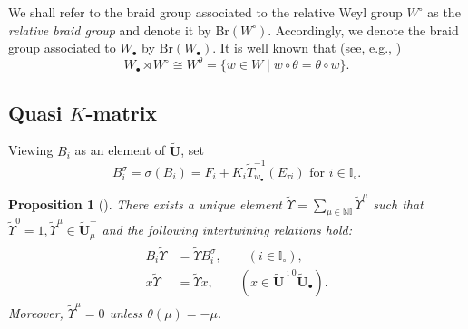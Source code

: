 \documentclass[a4paper,reqno,12pt]{amsart}
\numberwithin{equation}{section}
\newtheorem{proposition}{Proposition}[section]
\theoremstyle{definition}
\theoremstyle{plain}
\theoremstyle{definition}
\def\N{\mathbb N}
\def\I{\mathbb I}
\def\wI{\I_\circ}
\def\bw{w_\bullet}
\def\tU{\widetilde{\mathbf U}}
\def\tUi{\widetilde{\mathbf U}^{\imath}}
\def \tbU{\tU_{\bullet}}
\def\tTD{\widetilde T}
\def\tTT{\widetilde{\mathbf T}}
\def\tfX{\widetilde\Upsilon}
\begin{document}
We shall refer to the braid group associated to the relative Weyl group $W^\circ$ as the {\em relative braid group} and denote it by $\mathrm{Br}(W^\circ)$. Accordingly, we denote the braid group associated to $W_\bullet$ by $\mathrm{Br}(W_\bullet)$.  It is well known that (see, e.g., \cite[\S 2.2]{DK19})
\begin{equation}\label{eq:small weyl group}
    W_\bullet \rtimes W^\circ\cong W^\theta=\{w\in W\mid w\circ\theta=\theta\circ w\}.
\end{equation}

\subsection{Quasi $K$-matrix}


Viewing $B_i$ as an element of $\tU$, set 
$$B_i^\sigma=\sigma(B_i)=F_i+K_i\tTD^{-1}_{\bw}( E_{\tau i})\text{ for }i\in\I_\circ.$$ 
\begin{proposition}
		[]
		\label{prop:Kmatrix}
There exists a unique element $\tfX=\sum_{\mu \in \N \I} \tfX^{\mu}$ such that $\tfX^0=1, \tfX^{\mu}\in \tU_{\mu}^+$ and the following intertwining relations hold:
 \begin{align}\label{eq:fX2}
 \begin{split}
 B_i  \tfX &=  \tfX B_i^{\sigma},\qquad (i\in \wI),\\
 x  \tfX &= \tfX x,\qquad (x\in \tU^{\imath 0}\tbU).
 \end{split}
 \end{align}
 Moreover, $\tfX^\mu =0$ unless $\theta (\mu) =-\mu$.
 \end{proposition}
\end{document}

